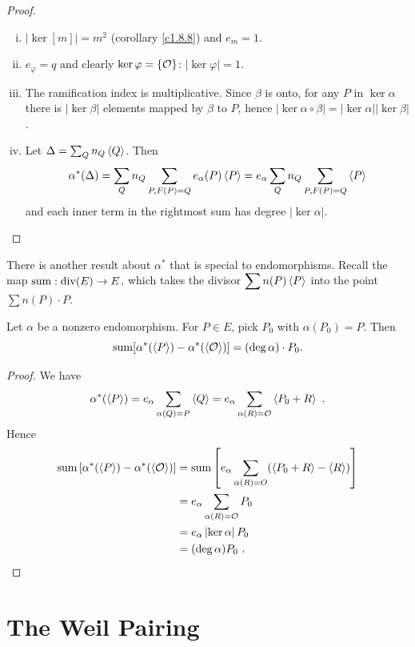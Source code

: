 \begin{proof}
~
\begin{enumerate}[(i)]
\item
$\left|\ker [m]\right|=m^2$ (corollary \ref{c1.8.8}) and $e_{m}=1$.
\item
$e_{\varphi}=q$  and clearly  $\ker \varphi=\{\mathcal{O}\}$: $\left|\ker \varphi\right|=1$.
\item
The ramification index is multiplicative. Since $\beta$ is onto, for any $P$ in $\ker \alpha$ there is $\left|\ker \beta \right|$ elements mapped by $\beta$ to $P$, hence $\left|\ker \alpha \circ \beta \right| = \left|\ker \alpha \right| \left|\ker \beta \right|$.
\item
Let $\Delta = \sum_Q n_Q \left\langle Q \right \rangle$. Then 
\[\alpha^*(\Delta) = \sum_Q n_Q \sum_{P, F(P)=Q} e_{\alpha}(P) \left\langle P \right \rangle = e_{\alpha} \sum_Q n_Q \sum_{P, F(P)=Q}  \left\langle P \right \rangle\]
and each inner term in the rightmost sum has degree $\left|\ker \alpha\right|$.
\end{enumerate}
\end{proof}

There is another result about $\alpha^{*}$ that is special to endomorphisms. Recall the map $\operatorname{sum}: \operatorname{div}(E) \rightarrow E$, which takes the divisor $\displaystyle \sum n(P)\left\langle P \right \rangle$ into the point $\displaystyle \sum n(P)\cdot P$.

\begin{prop}
\label{p12.16}
Let $\alpha$ be a nonzero endomorphism. For $P\in E$, pick $P_{0}$  with $\alpha(P_{0})=P$. Then
\[
\operatorname{sum}[\alpha^{*}(\left\langle P \right \rangle)-\alpha^{*}(\left\langle \mathcal{O} \right \rangle)]=(\deg\alpha)\cdot P_{0} .
\]
\end{prop}

\begin{proof}
We have
$$
\alpha^{*}(\divisor{P})=e_{\alpha}\sum_{\alpha(Q)=P}\divisor{Q}=e_{\alpha}\sum_{\alpha(R)=\cuz}\divisor{P_{0}+R}\ .
$$
Hence
\begin{align*}
\operatorname{sum}\left[\alpha^{*}(\left\langle P \right \rangle)-\alpha^{*}(\left\langle \mathcal{O} \right \rangle)\right]
&= \operatorname{sum} \left[e_{\alpha} \sum_{\alpha(R)=O}(\left\langle P_{0}+R \right \rangle-\left\langle R \right \rangle)\right]\\
&=e_{\alpha}\sum_{\alpha(R)=\mathcal{O}}P_{0}\\
&=e_{\alpha} \left|\ker \alpha\right| P_{0}\\
&=(\deg\alpha) P_{0}\ .
\end{align*}
\end{proof}

\section{The Weil Pairing}

